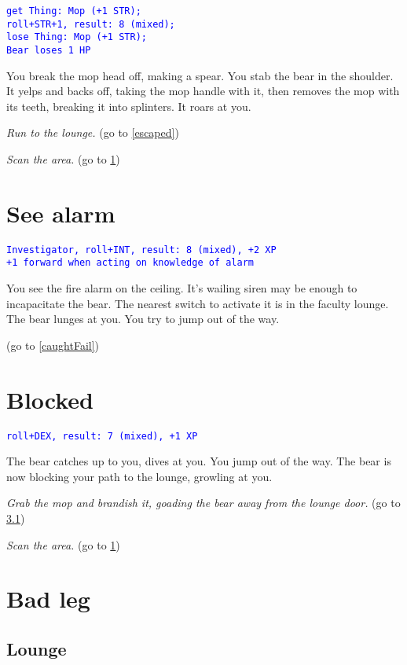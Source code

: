 \documentclass[12pt]{article}
\begin{document}
\textcolor{blue}{\texttt{get Thing:~Mop (+1 STR);}}\\
\textcolor{blue}{\texttt{roll+STR+1, result:~8 (mixed);}}\\
\textcolor{blue}{\texttt{lose Thing:~Mop (+1 STR);}}\\
\textcolor{blue}{\texttt{Bear loses 1 HP}}

You break the mop head off, making a spear. You stab the bear in the shoulder. It yelps and backs off, taking the mop handle with it, then removes the mop with its teeth, breaking it into splinters. It roars at you.

\textit{Run to the lounge.} (go to \ref{escaped})

\textit{Scan the area.} (go to \ref{seeAlarm})

\section{See alarm}\label{seeAlarm}

\textcolor{blue}{\texttt{Investigator, roll+INT, result:~8 (mixed), +2 XP}}\\
\textcolor{blue}{\texttt{+1 forward when acting on knowledge of alarm}}

You see the fire alarm on the ceiling. It's wailing siren may be enough to incapacitate the bear. The nearest switch to activate it is in the faculty lounge. The bear lunges at you. You try to jump out of the way.

(go to \ref{caughtFail})

\section{Blocked}\label{blocked}

\textcolor{blue}{\texttt{roll+DEX, result:~7 (mixed), +1 XP}}

The bear catches up to you, dives at you. You jump out of the way. The bear is now blocking your path to the lounge, growling at you.

\textit{Grab the mop and brandish it, goading the bear away from the lounge door.} (go to \ref{lounge})

\textit{Scan the area.} (go to \ref{seeAlarm})

\section{Bad leg}\label{badLeg}

\subsection{Lounge}\label{lounge}
\end{document}
